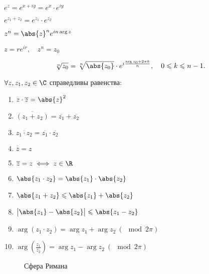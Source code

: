 \begin{multicols}{2}
	$e^z = e^{x+iy} = e^x \cdot e^{iy}$

	$e^{z_1+z_2} = e^{z_1}\cdot e^{z_2}$

	$z^n = \abs{z}^n e^{in\arg z}$

	$z = re^{ir}, \quad z^n = z_0$
\end{multicols}

\[
	\sqrt[n]{z_0} = \sqrt[n]{\abs{z_0}} \cdot e^{i \frac{\arg z_0 + 2\pi k}{n}}, \quad 0 \leqslant k \leqslant n-1.
\]

\begin{theorem}
	$\forall z,z_1,z_2 \in \C$ справедливы равенства:
	\begin{multicols}{2}
		\begin{enumerate}
			\item $z \cdot \overline{z} = \abs{z}^2$ \\
			\item $\overline{(z_1 + z_2)} = \overline{z_1} + \overline{z_2}$ \\
			\item $\overline{z_1 \cdot z_2} = \overline{z_1}\cdot \overline{z_2}$ \\
			\item $\overline{\overline{z}} = z$ \\
			\item $\overline{z} = z \iff z \in \R$ \\
			\item $\abs{z_1 \cdot z_2} = \abs{z_1} \cdot \abs{z_2}$ \\
			\item $\abs{z_1 + z_2} \leqslant \abs{z_1} + \abs{z_2}$ \\
			\item $\big|\abs{z_1} - \abs{z_2}\big| \leqslant \abs{z_1 - z_2}$ \\
			\item $\arg(z_1 \cdot z_2) = \arg z_1 + \arg z_2 \ (\mod 2\pi)$ \\
			\item $\arg \left(\frac{z_1}{z_2}\right) = \arg z_1 - \arg z_2 \ (\mod 2\pi)$
		\end{enumerate}
	\end{multicols}
\end{theorem}

\begin{figure}[H]
	\centering
	\caption{Сфера Римана}
	\label{fig:fig-2}
\end{figure}

